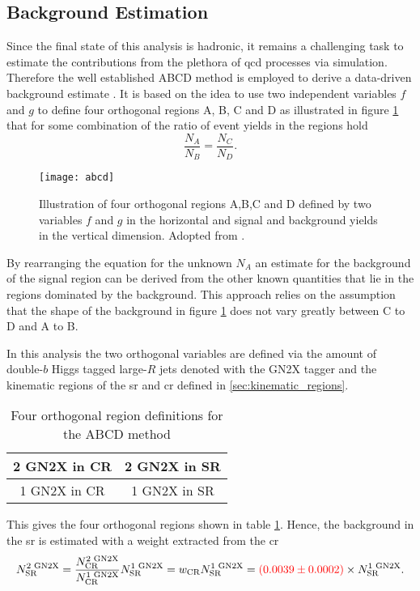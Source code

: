 \subsection{Background Estimation}\label{sec:abcd}
Since the final state of this analysis is hadronic, it remains a challenging task to estimate the contributions from the plethora of \ac{qcd} processes via simulation. 
Therefore the well established ABCD method is employed to derive a data-driven background estimate \citep{buttinger2018background,PhysRevD.103.035021}. It is based on the idea to use two independent variables $f$ and $g$ to define four orthogonal regions A, B, C and D as illustrated in figure \ref{fig:abcd} that for some combination of the ratio of event yields in the regions hold
\begin{equation}
    \frac{N_A}{N_B}=\frac{N_C}{N_D}.
\end{equation}
\begin{figure}
    \centering
    \texttt{[image: abcd]}
    \caption[]{Illustration of four orthogonal regions A,B,C and D defined by two variables $f$ and $g$ in the horizontal and signal and background yields in the vertical dimension. Adopted from \citep{PhysRevD.103.035021}.}
    \label{fig:abcd}
\end{figure}
By rearranging the equation for the unknown $N_A$ an estimate for the background of the signal region can be derived from the other known quantities that lie in the regions dominated by the background. This approach relies on the assumption that the shape of the background in figure \ref{fig:abcd} does not vary greatly between C to D and A to B. 

In this analysis the two orthogonal variables are defined via the amount of double-$b$ Higgs tagged large-$R$ jets denoted with the GN2X tagger and the kinematic regions of the \ac{sr} and \ac{cr} defined in \ref{sec:kinematic_regions}.
\begin{table}[htbp]
    \centering
    \caption{Four orthogonal region definitions for the ABCD method}
    \begin{tabular}{|c|c|}
        \hline
        2 GN2X in CR & 2 GN2X in SR \\ \hline
        1 GN2X in CR & 1 GN2X in SR \\ \hline
    \end{tabular}
    \label{tab:abcd}
\end{table}
This gives the four orthogonal regions shown in table \ref{tab:abcd}. Hence, the background in the \ac{sr} is estimated with a weight extracted from the \ac{cr}
\begin{equation}
    N_\text{SR}^\text{2 GN2X}=\frac{N_\text{CR}^\text{2 GN2X}}{N_\text{CR}^\text{1 GN2X}} N_\text{SR}^\text{1 GN2X} = w_\text{CR} N_\text{SR}^\text{1 GN2X}=  \textcolor{red}{(0.0039 \pm 0.0002)} \times N_\text{SR}^\text{1 GN2X}.
\end{equation}



